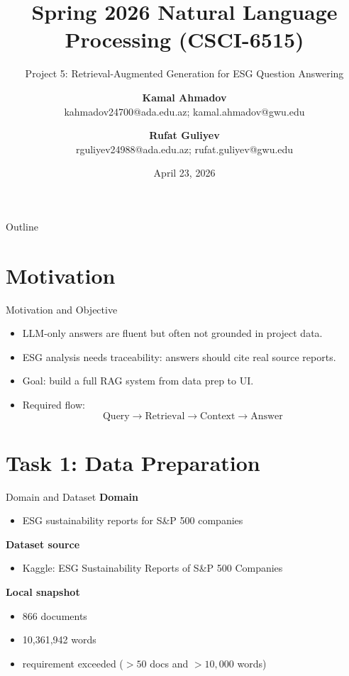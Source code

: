 \documentclass{beamer}
\title{Spring 2026 Natural Language Processing (CSCI-6515)}
\subtitle{Project 5: Retrieval-Augmented Generation for ESG Question Answering}
\author{
\textbf{Kamal Ahmadov} \\ \small kahmadov24700@ada.edu.az; kamal.ahmadov@gwu.edu \\ \and
\textbf{Rufat Guliyev} \\ \small rguliyev24988@ada.edu.az; rufat.guliyev@gwu.edu
}
\institute{ADA University \& George Washington University}
\date{April 23, 2026}
\begin{document}
\begin{frame}
  \titlepage
\end{frame}

\begin{frame}{Outline}
\tableofcontents
\end{frame}

\section{Motivation}

\begin{frame}{Motivation and Objective}
\begin{itemize}
  \item LLM-only answers are fluent but often not grounded in project data.
  \item ESG analysis needs traceability: answers should cite real source reports.
  \item Goal: build a full RAG system from data prep to UI.
  \item Required flow:
  \[
  \text{Query} \rightarrow \text{Retrieval} \rightarrow \text{Context} \rightarrow \text{Answer}
  \]
\end{itemize}
\end{frame}

\section{Task 1: Data Preparation}

\begin{frame}{Domain and Dataset}
\small
\textbf{Domain}
\begin{itemize}
  \item ESG sustainability reports for S\&P 500 companies
\end{itemize}

\textbf{Dataset source}
\begin{itemize}
  \item Kaggle: ESG Sustainability Reports of S\&P 500 Companies
\end{itemize}

\textbf{Local snapshot}
\begin{itemize}
  \item 866 documents
  \item 10,361,942 words
  \item requirement exceeded (\(>50\) docs and \(>10,000\) words)
\end{itemize}
\end{frame}
\end{document}
